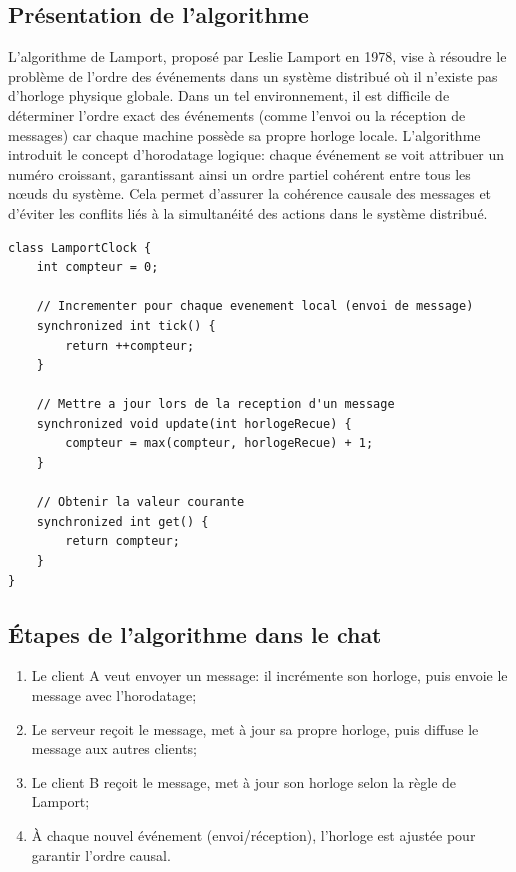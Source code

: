 \documentclass[a4paper,12pt]{article}
\begin{document}
\subsection{Présentation de l'algorithme}
L'algorithme de Lamport, proposé par Leslie Lamport en 1978, vise à résoudre le problème de l'ordre des événements dans un système distribué où il n'existe pas d'horloge physique globale. Dans un tel environnement, il est difficile de déterminer l'ordre exact des événements (comme l'envoi ou la réception de messages) car chaque machine possède sa propre horloge locale. L'algorithme introduit le concept d'horodatage logique: chaque événement se voit attribuer un numéro croissant, garantissant ainsi un ordre partiel cohérent entre tous les nœuds du système. Cela permet d'assurer la cohérence causale des messages et d'éviter les conflits liés à la simultanéité des actions dans le système distribué.
\begin{lstlisting}
class LamportClock {
    int compteur = 0;

    // Incrementer pour chaque evenement local (envoi de message)
    synchronized int tick() {
        return ++compteur;
    }

    // Mettre a jour lors de la reception d'un message
    synchronized void update(int horlogeRecue) {
        compteur = max(compteur, horlogeRecue) + 1;
    }

    // Obtenir la valeur courante
    synchronized int get() {
        return compteur;
    }
}
\end{lstlisting}

\subsection{Étapes de l'algorithme dans le chat}
\begin{enumerate}
    \item Le client A veut envoyer un message: il incrémente son horloge, puis envoie le message avec l'horodatage;
    \item Le serveur reçoit le message, met à jour sa propre horloge, puis diffuse le message aux autres clients;
    \item Le client B reçoit le message, met à jour son horloge selon la règle de Lamport;
    \item À chaque nouvel événement (envoi/réception), l'horloge est ajustée pour garantir l'ordre causal.
\end{enumerate}
\end{document}
